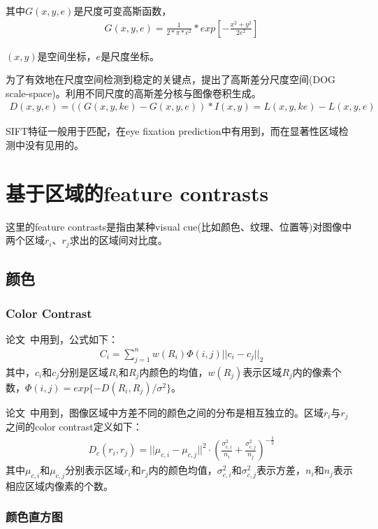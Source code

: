 \documentclass[12pt]{article}
\begin{document}
其中$G(x, y, e)$是尺度可变高斯函数，
\begin{align}
 G(x,y,e) = \frac{1}{2*\pi *e^2} * exp[-\frac{x^2 + y^2}{2e^2}]
\end{align}

$(x, y)$是空间坐标，$e$是尺度坐标。

为了有效地在尺度空间检测到稳定的关键点，提出了高斯差分尺度空间(DOG scale-space)。利用不同尺度的高斯差分核与图像卷积生成。
\begin{align}
D(x,y,e) = ((G(x,y,ke) - G(x,y,e)) * I(x,y) = L(x,y,ke) - L(x,y,e)
\end{align}

SIFT特征一般用于匹配，在eye fixation prediction中有用到，而在显著性区域检测中没有见用的。

\section{基于区域的feature contrasts}

这里的feature contrasts是指由某种visual cue(比如颜色、纹理、位置等)对图像中两个区域$r_i$、$r_j$求出的区域间对比度。

\subsection{颜色}

\subsubsection{Color Contrast}

论文~\cite{yan2013hierarchical}中用到，公式如下：
\begin{align}
C_i = \sum_{j=1}^{n}w(R_i)\Phi(i, j)||c_i-c_j||_2
\end{align}
其中，$c_i$和$c_j$分别是区域$R_i$和$R_j$内颜色的均值，$w(R_j)$表示区域$R_j$内的像素个数，$\Phi(i, j) = exp\{ -D(R_i, R_j)/\sigma^2\}$。

论文~\cite{zhu2014tag}中用到，图像区域中方差不同的颜色之间的分布是相互独立的。区域$r_i$与$r_j$之间的color contrast定义如下：
\begin{align}
D_c(r_i, r_j) = ||\mu_{c, i}-\mu_{c, j}||^2\cdot \left(\frac{\sigma_{c, i}^2}{n_i}+\frac{\sigma_{c, j}^2}{n_j}\right)^{-\frac{1}{2}}
\end{align}
其中$\mu_{c, i}$和$\mu_{c, j}$分别表示区域$r_i$和$r_j$内的颜色均值，$\sigma_{c, i}^2$和$\sigma_{c, j}^2$表示方差，$n_i$和$n_j$表示相应区域内像素的个数。

\subsubsection{颜色直方图}
\end{document}
